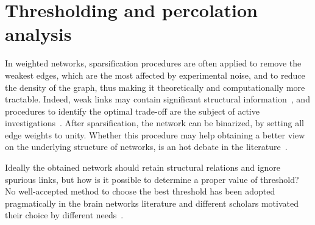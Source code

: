 \section{Thresholding and percolation analysis}
\label{sec:percolation_analysis}
In weighted networks, sparsification procedures are often applied to remove the weakest edges, which are the most affected by experimental noise, and to reduce the density of the graph, thus making it theoretically and computationally more tractable.
Indeed, weak links may contain significant structural information~\cite{thomas2011}, and procedures to identify the optimal trade-off are the subject of active investigations~\cite{zahoranszky-kohalmi2016a}.
After sparsification, the network can be binarized, by setting all edge weights to unity.
Whether this procedure may help obtaining a better view on the underlying structure of networks, is an hot debate in the literature~\cite{rubinov2010,thomas2011}.

Ideally the obtained network should retain structural relations and ignore spurious links, but how is it possible to determine a proper value of threshold?
No well-accepted method to choose the best threshold has been adopted pragmatically in the brain networks literature and different scholars motivated their choice by different needs~\cite{gallos2012,lee2011,scheinost2012}.

